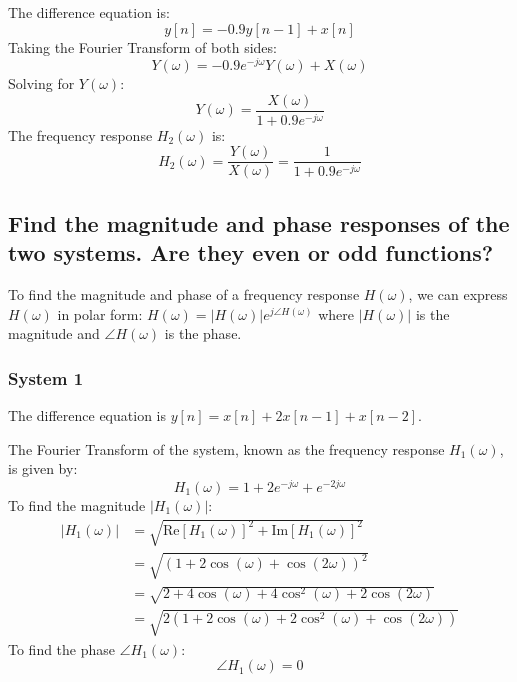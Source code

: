 The difference equation is:
\begin{equation*}
y[n] = -0.9y[n-1] + x[n]
\end{equation*}
Taking the Fourier Transform of both sides:
\begin{equation*}
Y(\omega) = -0.9e^{-j\omega}Y(\omega) + X(\omega)
\end{equation*}
Solving for $ Y(\omega) $:
\begin{equation*}
Y(\omega) = \frac{X(\omega)}{1 + 0.9e^{-j\omega}}
\end{equation*}
The frequency response $ H_2(\omega) $ is:
\begin{equation*}
H_2(\omega) = \frac{Y(\omega)}{X(\omega)} = \frac{1}{1 + 0.9e^{-j\omega}}
\end{equation*}

\subsection*{Find the magnitude and phase responses of the two systems. Are they
even or odd functions?}

To find the magnitude and phase of a frequency response $H(\omega)$, we can express $H(\omega)$ in polar form: $H(\omega)=|H(\omega)|e^{j\angle H(\omega)}$ where $|H(\omega)|$ is the magnitude and $\angle H(\omega)$ is the phase.

\subsubsection*{System 1}

The difference equation is $ y[n] = x[n] + 2x[n-1] + x[n-2] $.

The Fourier Transform of the system, known as the frequency response $ H_1(\omega) $, is given by:
\begin{equation*}
H_1(\omega) = 1 + 2e^{-j\omega} + e^{-2j\omega}
\end{equation*}
To find the magnitude $ |H_1(\omega)| $:
\begin{equation*}
\begin{aligned}
|H_1(\omega)| &= \sqrt{\text{Re}[H_1(\omega)]^2 + \text{Im}[H_1(\omega)]^2} \\
&= \sqrt{(1 + 2\cos(\omega) + \cos(2\omega))^2} \\
&= \sqrt{2 + 4\cos(\omega) + 4\cos^2(\omega) + 2\cos(2\omega)} \\
&= \sqrt{2(1 + 2\cos(\omega) + 2\cos^2(\omega) + \cos(2\omega))}
\end{aligned}
\end{equation*}
To find the phase $ \angle H_1(\omega) $:
\begin{equation*}
\angle H_1(\omega) = 0
\end{equation*}

